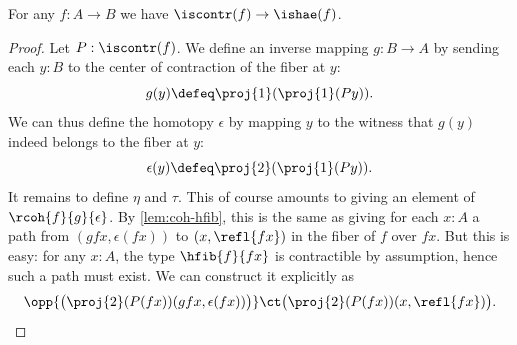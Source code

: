 %
\begin{thm}\label{thm:lequiv-contr-hae}
For any $f:A\to B$ we have ${\iscontr(f)} \to {\ishae(f)}$.
\end{thm}

\begin{proof}
Let $P : \iscontr(f)$. We define an inverse mapping $g : B \to A$ by sending each $y : B$ to the center of contraction of the fiber at $y$:
\[ g(y) \defeq \proj{1}(\proj{1}(Py)). \]
We can thus define the homotopy $\epsilon$ by mapping $y$ to the witness that $g(y)$ indeed belongs to the fiber at $y$:
\[ \epsilon(y) \defeq \proj{2}(\proj{1}(P y)). \]
It remains to define $\eta$ and $\tau$. This of course amounts to giving an element of $\rcoh{f}{g}{\epsilon}$. By \cref{lem:coh-hfib}, this is the same as giving for each $x:A$ a path from $(gfx,\epsilon(fx))$ to $(x,\refl{fx})$ in the fiber of $f$ over $fx$. But this is easy: for any $x : A$, the type $\hfib{f}{fx}$
is contractible by assumption, hence such a path must exist. We can construct it explicitly as
\[\opp{\big(\proj{2}(P(fx))(gfx,\epsilon(fx))\big)} \ct \big(\proj{2}(P(fx)) (x,\refl{fx})\big). \qedhere \]
\end{proof}
